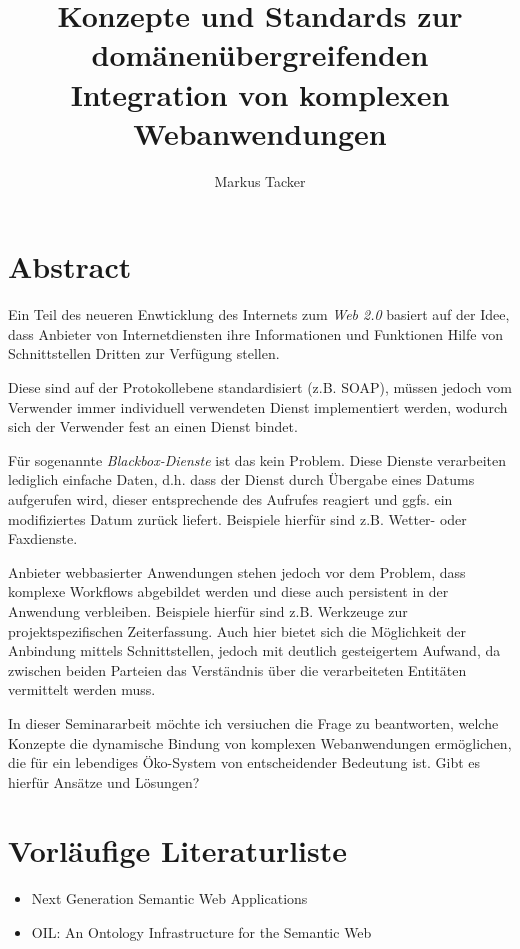 \documentclass[12pt,a4paper]{article}
\begin{document}
\author{Markus Tacker}
\title{Konzepte und Standards zur domänenübergreifenden Integration von komplexen Webanwendungen}
\maketitle
\section*{Abstract}
Ein Teil des neueren Enwticklung des Internets zum \emph{Web 2.0} basiert auf der Idee, dass Anbieter von Internetdiensten ihre Informationen und Funktionen Hilfe von Schnittstellen Dritten zur Verfügung stellen.

Diese sind auf der Protokollebene standardisiert (z.B. SOAP), müssen jedoch vom Verwender immer individuell verwendeten Dienst implementiert werden, wodurch sich der Verwender fest an einen Dienst bindet.

Für sogenannte \emph{Blackbox-Dienste} ist das kein Problem. Diese Dienste verarbeiten lediglich einfache Daten, d.h. dass der Dienst durch Übergabe eines Datums aufgerufen wird, dieser entsprechende des Aufrufes reagiert und ggfs. ein modifiziertes Datum zurück liefert. Beispiele hierfür sind z.B. Wetter- oder Faxdienste. 

Anbieter webbasierter Anwendungen stehen jedoch vor dem Problem, dass komplexe Workflows abgebildet werden und diese auch persistent in der Anwendung verbleiben. Beispiele hierfür sind z.B. Werkzeuge zur projektspezifischen Zeiterfassung. Auch hier bietet sich die Möglichkeit der Anbindung mittels Schnittstellen, jedoch mit deutlich gesteigertem Aufwand, da zwischen beiden Parteien das Verständnis über die verarbeiteten Entitäten vermittelt werden muss. 


In dieser Seminararbeit möchte ich versiuchen die Frage zu beantworten, welche Konzepte die dynamische Bindung von komplexen Webanwendungen ermöglichen, die für ein lebendiges Öko-System von entscheidender Bedeutung ist. Gibt es hierfür Ansätze und Lösungen?
\section*{Vorläufige Literaturliste}
\begin{itemize}
\item Next Generation Semantic Web Applications \cite{Motta06nextgeneration}
\item OIL: An Ontology Infrastructure for the Semantic Web \cite{oil}
\end{itemize}

 
\end{document}
